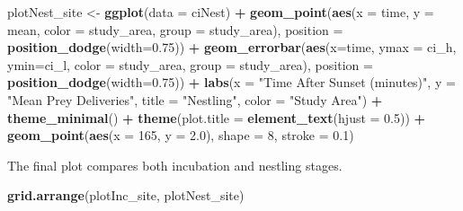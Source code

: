 \documentclass[]{article}
\newenvironment{Shaded}{\begin{snugshade}}{\end{snugshade}}
\newcommand{\DataTypeTok}[1]{\textcolor[rgb]{0.13,0.29,0.53}{#1}}
\newcommand{\DecValTok}[1]{\textcolor[rgb]{0.00,0.00,0.81}{#1}}
\newcommand{\FloatTok}[1]{\textcolor[rgb]{0.00,0.00,0.81}{#1}}
\newcommand{\KeywordTok}[1]{\textcolor[rgb]{0.13,0.29,0.53}{\textbf{#1}}}
\newcommand{\NormalTok}[1]{#1}
\newcommand{\OperatorTok}[1]{\textcolor[rgb]{0.81,0.36,0.00}{\textbf{#1}}}
\newcommand{\StringTok}[1]{\textcolor[rgb]{0.31,0.60,0.02}{#1}}
\begin{document}
\begin{Shaded}
\begin{Highlighting}[]
\NormalTok{plotNest_site <-}\StringTok{ }\KeywordTok{ggplot}\NormalTok{(}\DataTypeTok{data =}\NormalTok{ ciNest) }\OperatorTok{+}
\StringTok{  }\KeywordTok{geom_point}\NormalTok{(}\KeywordTok{aes}\NormalTok{(}\DataTypeTok{x =}\NormalTok{ time, }\DataTypeTok{y =}\NormalTok{ mean, }\DataTypeTok{color =}\NormalTok{ study_area, }\DataTypeTok{group =}\NormalTok{ study_area),}
             \DataTypeTok{position =} \KeywordTok{position_dodge}\NormalTok{(}\DataTypeTok{width=}\FloatTok{0.75}\NormalTok{)) }\OperatorTok{+}
\StringTok{  }\KeywordTok{geom_errorbar}\NormalTok{(}\KeywordTok{aes}\NormalTok{(}\DataTypeTok{x=}\NormalTok{time, }\DataTypeTok{ymax =}\NormalTok{ ci_h, }\DataTypeTok{ymin=}\NormalTok{ci_l, }\DataTypeTok{color =}\NormalTok{ study_area, }
                    \DataTypeTok{group =}\NormalTok{ study_area),}
                \DataTypeTok{position =} \KeywordTok{position_dodge}\NormalTok{(}\DataTypeTok{width=}\FloatTok{0.75}\NormalTok{)) }\OperatorTok{+}
\StringTok{  }\KeywordTok{labs}\NormalTok{(}\DataTypeTok{x =} \StringTok{"Time After Sunset (minutes)"}\NormalTok{, }\DataTypeTok{y =} \StringTok{"Mean Prey Deliveries"}\NormalTok{, }
       \DataTypeTok{title =} \StringTok{"Nestling"}\NormalTok{, }\DataTypeTok{color =} \StringTok{"Study Area"}\NormalTok{) }\OperatorTok{+}
\StringTok{  }\KeywordTok{theme_minimal}\NormalTok{() }\OperatorTok{+}
\StringTok{  }\KeywordTok{theme}\NormalTok{(}\DataTypeTok{plot.title =} \KeywordTok{element_text}\NormalTok{(}\DataTypeTok{hjust =} \FloatTok{0.5}\NormalTok{)) }\OperatorTok{+}
\StringTok{  }\KeywordTok{geom_point}\NormalTok{(}\KeywordTok{aes}\NormalTok{(}\DataTypeTok{x =} \DecValTok{165}\NormalTok{, }\DataTypeTok{y =} \FloatTok{2.0}\NormalTok{), }\DataTypeTok{shape =} \DecValTok{8}\NormalTok{, }\DataTypeTok{stroke =} \FloatTok{0.1}\NormalTok{)}
\end{Highlighting}
\end{Shaded}

The final plot compares both incubation and nestling stages.

\begin{Shaded}
\begin{Highlighting}[]
\KeywordTok{grid.arrange}\NormalTok{(plotInc_site, plotNest_site)}
\end{Highlighting}
\end{Shaded}
\end{document}
